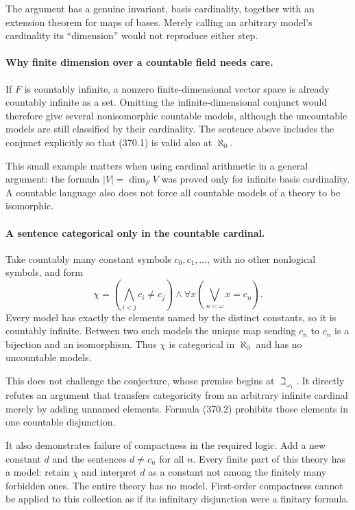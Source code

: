 \documentclass[11pt]{article}
\begin{document}
The argument has a genuine invariant, basis cardinality, together with
an extension theorem for maps of bases. Merely calling an arbitrary
model's cardinality its ``dimension'' would not reproduce either step.

\paragraph{Why finite dimension over a countable field needs care.}
If $F$ is countably infinite, a nonzero finite-dimensional vector space
is already countably infinite as a set. Omitting the infinite-dimensional
conjunct would therefore give several nonisomorphic countable models,
although the uncountable models are still classified by their cardinality.
The sentence above includes the conjunct explicitly so that (370.1)
is valid also at $\aleph_0$.

This small example matters when using cardinal arithmetic in a general
argument: the formula $|V|=\dim_FV$ was proved only for infinite
basis cardinality. A countable language also does not force all
countable models of a theory to be isomorphic.

\paragraph{A sentence categorical only in the countable cardinal.}
Take countably many constant symbols $c_0,c_1,\ldots$, with no other
nonlogical symbols, and form
\[
 \chi=\left(\bigwedge_{i<j}c_i\ne c_j\right)
       \wedge\forall x\left(\bigvee_{n<\omega}x=c_n\right).
 \tag{370.2}
\]
Every model has exactly the elements named by the distinct constants,
so it is countably infinite. Between two such models the unique map
sending $c_n$ to $c_n$ is a bijection and an isomorphism. Thus $\chi$
is categorical in $\aleph_0$ and has no uncountable models.

This does not challenge the conjecture, whose premise begins at
$\beth_{\omega_1}$. It directly refutes an argument that transfers
categoricity from an arbitrary infinite cardinal merely by adding
unnamed elements. Formula (370.2) prohibits those elements in one
countable disjunction.

It also demonstrates failure of compactness in the required logic.
Add a new constant $d$ and the sentences $d\ne c_n$ for all $n$.
Every finite part of this theory has a model: retain $\chi$ and
interpret $d$ as a constant not among the finitely many forbidden
ones. The entire theory has no model. First-order compactness cannot
be applied to this collection as if its infinitary disjunction were
a finitary formula.
\end{document}
